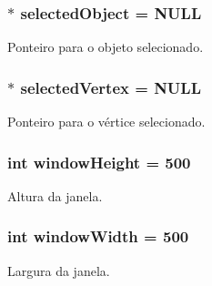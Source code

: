 \subsubsection[{selected\+Object}]{$\ast$ selected\+Object = N\+U\+L\+L}\label{group___world_ga46a409c7a0b8f22f142780e936c75159}
Ponteiro para o objeto selecionado. \hypertarget{group___world_ga7bc21ab50154f979a1a4193c1ff21ce8}{}
\subsubsection[{selected\+Vertex}]{$\ast$ selected\+Vertex = N\+U\+L\+L}\label{group___world_ga7bc21ab50154f979a1a4193c1ff21ce8}
Ponteiro para o vértice selecionado. \hypertarget{group___world_gaf140802328ffe8a45749114b1c5a2056}{}
\subsubsection[{window\+Height}]{\setlength{\rightskip}{0pt plus 5cm}int window\+Height = 500}\label{group___world_gaf140802328ffe8a45749114b1c5a2056}
Altura da janela. \hypertarget{group___world_gaa61000540636bfdc4c9f27045ab84ce9}{}
\subsubsection[{window\+Width}]{\setlength{\rightskip}{0pt plus 5cm}int window\+Width = 500}\label{group___world_gaa61000540636bfdc4c9f27045ab84ce9}
Largura da janela. 